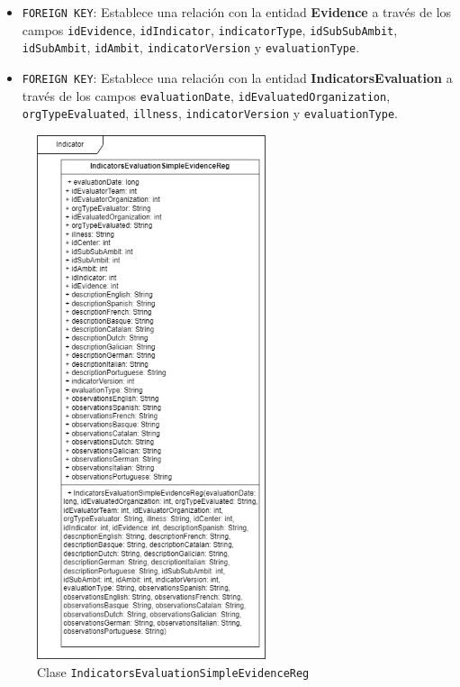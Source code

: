 \begin{itemize}
\begin{itemize}
      \item \texttt{FOREIGN KEY}: Establece una relación con la entidad \textbf{Evidence} a través de los campos \texttt{idEvidence}, \texttt{idIndicator}, \texttt{indicatorType}, \texttt{idSubSubAmbit}, \texttt{idSubAmbit}, \texttt{idAmbit}, \texttt{indicatorVersion} y \texttt{evaluationType}.
      \item \texttt{FOREIGN KEY}: Establece una relación con la entidad \textbf{IndicatorsEvaluation} a través de los campos \texttt{evaluationDate}, \texttt{idEvaluatedOrganization}, \texttt{orgTypeEvaluated}, \texttt{illness}, \texttt{indicatorVersion} y \texttt{evaluationType}.
    \end{itemize}


    \begin{figure}[H]
        \centering
        \includegraphics[width=0.6\textwidth]{./Figuras/Diagramas/IndicatorsEvaluationSimpleEvidenceReg.png}
        \caption{Clase \texttt{IndicatorsEvaluationSimpleEvidenceReg}}\label{fig:./Figuras/Diagramas/IndicatorsEvaluationSimpleEvidenceReg.png}
    \end{figure}
    

\end{itemize}
